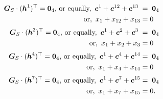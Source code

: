 \documentclass[conference,letterpaper]{IEEEtran}
\begin{document}
\begin{align}
\boldsymbol{G}_S\cdot(\boldsymbol{h}^1)^{\top} = \boldsymbol{0}_4, \, \text{or equally, }\, \boldsymbol{c}^{1}+\boldsymbol{c}^{12}+\boldsymbol{c}^{13} \;& =\; \boldsymbol{0}_4\notag\\ \text{or, }\, x_1 + x_{12} + x_{13} &= 0 \label{eq:pc1}\\[2pt]
\boldsymbol{G}_S\cdot(\boldsymbol{h}^3)^{\top} = \boldsymbol{0}_4, \, \text{or equally, }\, \boldsymbol{c}^{1}+\boldsymbol{c}^{2}+\boldsymbol{c}^{3} \;&=\; \boldsymbol{0}_4\notag\\ \text{or, }\, x_1 + x_{2} + x_{3} &= 0 \label{eq:pc3}\\[2pt]
\boldsymbol{G}_S\cdot(\boldsymbol{h}^4)^{\top} = \boldsymbol{0}_4, \, \text{or equally, }\, \boldsymbol{c}^{1}+\boldsymbol{c}^{4}+\boldsymbol{c}^{14} &= \;\boldsymbol{0}_4 \notag\\
\text{or, }\, x_1 + x_{4} + x_{14} &= 0 \label{eq:pc4}\\[2pt]
\boldsymbol{G}_S\cdot(\boldsymbol{h}^7)^{\top} = \boldsymbol{0}_4, \, \text{or equally, }\, \boldsymbol{c}^{1}+\boldsymbol{c}^{7}+\boldsymbol{c}^{15} &= \;\boldsymbol{0}_4 \notag\\
\text{or, }\, x_1 + x_{7} + x_{15} &= 0 \label{eq:pc7}.
\end{align}
\end{document}
